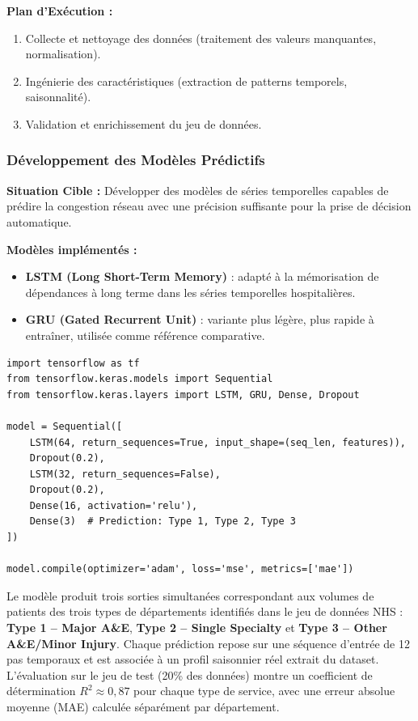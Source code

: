 \documentclass[12pt,a4paper]{article}
\begin{document}
\textbf{Plan d'Exécution :}
\begin{enumerate}[leftmargin=1.5cm]
  \item Collecte et nettoyage des données (traitement des valeurs manquantes, normalisation).
  \item Ingénierie des caractéristiques (extraction de patterns temporels, saisonnalité).
  \item Validation et enrichissement du jeu de données.
\end{enumerate}

\subsubsection{Développement des Modèles Prédictifs}

\textbf{Situation Cible :} Développer des modèles de séries temporelles capables de prédire la congestion réseau avec une précision suffisante pour la prise de décision automatique.

\textbf{Modèles implémentés :}
\begin{itemize}[leftmargin=1.5cm]
  \item \textbf{LSTM (Long Short-Term Memory)} : adapté à la mémorisation de dépendances à long terme dans les séries temporelles hospitalières.
  \item \textbf{GRU (Gated Recurrent Unit)} : variante plus légère, plus rapide à entraîner, utilisée comme référence comparative.
\end{itemize}

\begin{lstlisting}[caption={Exemple d'architecture LSTM pour la prédiction de flux}, label={lst:lstm}]
import tensorflow as tf
from tensorflow.keras.models import Sequential
from tensorflow.keras.layers import LSTM, GRU, Dense, Dropout

model = Sequential([
    LSTM(64, return_sequences=True, input_shape=(seq_len, features)),
    Dropout(0.2),
    LSTM(32, return_sequences=False),
    Dropout(0.2),
    Dense(16, activation='relu'),
    Dense(3)  # Prediction: Type 1, Type 2, Type 3
])

model.compile(optimizer='adam', loss='mse', metrics=['mae'])
\end{lstlisting}

Le modèle produit trois sorties simultanées correspondant aux volumes de patients des trois types de départements identifiés dans le jeu de données NHS : \textbf{Type 1 -- Major A\&E}, \textbf{Type 2 -- Single Specialty} et \textbf{Type 3 -- Other A\&E/Minor Injury}. Chaque prédiction repose sur une séquence d'entrée de 12 pas temporaux et est associée à un profil saisonnier réel extrait du dataset. L'évaluation sur le jeu de test (20\% des données) montre un coefficient de détermination $R^2 \approx 0,87$ pour chaque type de service, avec une erreur absolue moyenne (MAE) calculée séparément par département.
\end{document}
